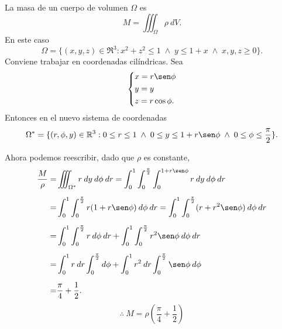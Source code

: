 \begin{solution}
    La masa de un cuerpo de volumen $\Omega$ es
    \[
        M=\iiint_\Omega \rho\:dV.
    \]
    En este caso
    \[
        \Omega=\{(x,y,z)\in\Re^3:x^2+z^2\leq1\;\land\;y\leq1+x\; \land\;x,y,z\geq0\}.
    \]
    Conviene trabajar en coordenadas cil\'indricas. Sea
    \[\begin{dcases}
            x=r\sen\phi \\
            y=y         \\
            z=r\cos\phi.
        \end{dcases}\]
    Entonces en el nuevo sistema de coordenadas
    \[
        \Omega^*=\{(r,\phi,y)\in\Re^3:    0\leq  r\leq1\; \land\; 0 \leq y\leq1+r\sen\phi\;\land\;  0\leq\phi\leq\frac{\pi}{2}\}.
    \]

    Ahora podemos reescribir, dado que $\rho$ es constante,
    \begin{align*}
        \frac{M}{\rho} = & \iiint_{\Omega^*} r\:dy\:d\phi\:dr=\int_0^1 \int_0^{\frac{\pi}{2}} \int_0^{1+r\sen\phi} r\:dy\:d\phi\:dr \\[.2cm]
        =                & \int_0^1 \int_0^{\frac{\pi}{2}}r(1+r\sen\phi)\:d\phi\:dr=\int_0^1 \int_0^{\frac{\pi}{2}} ( r+r^2\sen\phi) \:d\phi\:dr \\[.2cm]
        =                & \int_0^1\int_0^{\frac{\pi}{2}} r\:d\phi\:dr+\int_0^1\int_0^{\frac{\pi}{2}}r^2\sen\phi\:d\phi\:dr                      \\[.2cm]
        =                & \int_0^1r\:dr\int_0^{\frac{\pi}{2}}d\phi+\int_0^1r^2\:dr\int_0^{\frac{\pi}{2}}\sen\phi\:d\phi                         \\[.2cm]
        =                & \frac{\pi}{4}+\frac{1}{2}.
    \end{align*}
    \[
        \therefore\:M=\rho\left(\frac{\pi}{4}+\frac{1}{2}\right)
    \]
\end{solution}


